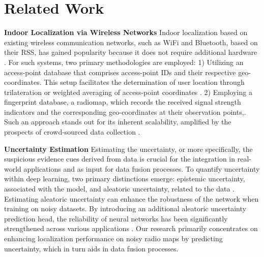 \section{Related Work}

\noindent \textbf{Indoor Localization via Wireless Networks}
Indoor localization based on existing wireless communication networks, such as WiFi \cite{wifireview2015yang} and Bluetooth\cite{bluetoo2016chen}, based on their RSS, has gained popularity because it does not require additional hardware \cite{wifireview2015yang}. For such systems, two primary methodologies are employed:
1) Utilizing an access-point database that comprises access-point IDs and their respective geo-coordinates. This setup facilitates the determination of user location through trilateration or weighted averaging of access-point coordinates \cite{WiGLEonline}.
2) Employing a fingerprint database, a radiomap, which records the received signal strength indicators and the corresponding geo-coordinates at their observation points\cite{radar2000bah},\cite{WILL2013wu}. Such an approach stands out for its inherent scalability, amplified by the prospects of crowd-sourced data collection \cite{crowdsource2010mink}. 


\noindent \textbf{Uncertainty Estimation}
Estimating the uncertainty, or more specifically, the suspicious evidence cues derived from data is crucial for the integration in real-world applications and as input for data fusion processes. 
To quantify uncertainty within deep learning, two primary distinctions emerge: epistemic uncertainty, associated with the model, and aleatoric uncertainty, related to the data \cite{kendall2017uncertainties}. 
Estimating aleatoric uncertainty can enhance the robustness of the network when training on noisy datasets. 
By introducing an additional aleatoric uncertainty prediction head, the reliability of neural networks has been significantly strengthened across various applications \cite{cai2022stun}\cite{poggi2020uncertainty}\cite{taha2019unsupervised}\cite{feng2018safe}. Our research primarily concentrates on enhancing localization performance on noisy radio maps by predicting uncertainty, which in turn aids in data fusion processes. 


